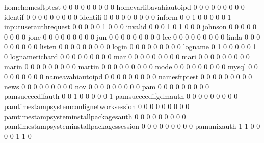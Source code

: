 \documentclass[compress,8pt]{beamer}
\begin{document}
\begin{frame}
\begin{Schunk}
  homehomesftptest                           0   0   0   0   0   0   0   0   0
  homevarlibavahiautoipd                     0   0   0   0   0   0   0   0   0
  identif                                    0   0   0   0   0   0   0   0   0
  identifi                                   0   0   0   0   0   0   0   0   0
  inform                                     0   0   1   0   0   0   0   0   1
  inputuserauthrequest                       0   0   0   0   0   1   0   0   0
  invalid                                    0   0   0   1   0   1   0   0   0
  johnson                                    0   0   0   0   0   0   0   0   0
  jone                                       0   0   0   0   0   0   0   0   0
  jun                                        0   0   0   0   0   0   0   0   0
  lee                                        0   0   0   0   0   0   0   0   0
  linda                                      0   0   0   0   0   0   0   0   0
  listen                                     0   0   0   0   0   0   0   0   0
  login                                      0   0   0   0   0   0   0   0   0
  logname                                    0   1   0   0   0   0   0   1   0
  lognamerichard                             0   0   0   0   0   0   0   0   0
  mar                                        0   0   0   0   0   0   0   0   0
  mari                                       0   0   0   0   0   0   0   0   0
  marin                                      0   0   0   0   0   0   0   0   0
  martin                                     0   0   0   0   0   0   0   0   0
  mode                                       0   0   0   0   0   0   0   0   0
  mysql                                      0   0   0   0   0   0   0   0   0
  nameavahiautoipd                           0   0   0   0   0   0   0   0   0
  namesftptest                               0   0   0   0   0   0   0   0   0
  news                                       0   0   0   0   0   0   0   0   0
  nov                                        0   0   0   0   0   0   0   0   0
  pam                                        0   0   0   0   0   0   0   0   0
  pamsucceedifauth                           0   0   1   0   0   0   0   0   1
  pamsucceedifgdmauth                        0   0   0   0   0   0   0   0   0
  pamtimestampsystemconfignetworksession     0   0   0   0   0   0   0   0   0
  pamtimestampsysteminstallpackagesauth      0   0   0   0   0   0   0   0   0
  pamtimestampsysteminstallpackagessession   0   0   0   0   0   0   0   0   0
  pamunixauth                                1   1   0   0   0   0   1   1   0

\end{Schunk}
\end{frame}
\end{document}
